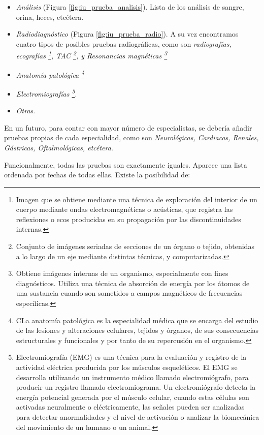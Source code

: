 			\begin{itemize}
				\item \textit{Análisis} (Figura \ref{fig:iu_prueba_analisis}). Lista de los análisis de sangre, orina, heces, etcétera.
				\item \textit{Radiodiagnóstico} (Figura \ref{fig:iu_prueba_radio}). A su vez encontramos cuatro tipos de posibles pruebas radiográficas, como son \textit{radiografías, ecografías \footnote{Imagen que se obtiene mediante una técnica de exploración del interior de un cuerpo mediante ondas electromagnéticas o acústicas, que registra las reflexiones o ecos producidas en su propagación por las discontinuidades internas.}, TAC \footnote{Conjunto de imágenes seriadas de secciones de un órgano o tejido, obtenidas a lo largo de un eje mediante distintas técnicas, y computarizadas.}, y Resonancias magnéticas \footnote{Obtiene imágenes internas de un organismo, especialmente con fines diagnósticos. Utiliza una técnica de absorción de energía por los átomos de una sustancia cuando son sometidos a campos magnéticos de frecuencias específicas.}}
				\item \textit{Anatomía patológica \footnote{CLa anatomía patológica es la especialidad médica que se encarga del estudio de las lesiones y alteraciones celulares, tejidos y órganos, de sus consecuencias estructurales y funcionales y por tanto de su repercusión en el organismo.}}
				\item \textit{Electromiografías \footnote{Electromiografía (EMG) es una técnica para la evaluación y registro de la actividad eléctrica producida por los músculos esqueléticos. El EMG se desarrolla utilizando un instrumento médico llamado electromiógrafo, para producir un registro llamado electromiograma. Un electromiógrafo detecta la energía potencial generada por el músculo celular, cuando estas células son activadas neuralmente o eléctricamente, las señales pueden ser analizadas para detectar anormalidades y el nivel de activación o analizar la biomecánica del movimiento de un humano o un animal.}}.
				\item \textit{Otras}.
			\end{itemize}
			
			En un futuro, para contar con mayor número de especialistas, se debería añadir pruebas propias de cada especialidad, como son \textit{Neurológicas, Cardiacas, Renales, Gástricas, Oftalmológicas, etcétera}.
			
			Funcionalmente, todas las pruebas son exactamente iguales. Aparece una lista ordenada por fechas de todas ellas. Existe la posibilidad de:
			

